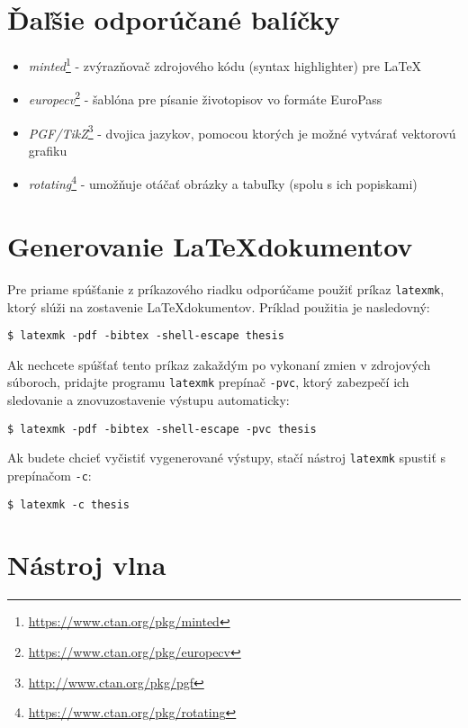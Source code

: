\section{Ďaľšie odporúčané balíčky}
\begin{itemize}
    \item \emph{minted}\footnote{\url{https://www.ctan.org/pkg/minted}} - zvýrazňovač zdrojového kódu (syntax highlighter) pre \LaTeX 
    \item \emph{europecv}\footnote{\url{https://www.ctan.org/pkg/europecv}} - šablóna pre písanie životopisov vo formáte EuroPass 
    \item \emph{PGF/TikZ}\footnote{\url{http://www.ctan.org/pkg/pgf}} - dvojica jazykov, pomocou ktorých je možné vytvárať vektorovú grafiku 
    \item \emph{rotating}\footnote{\url{https://www.ctan.org/pkg/rotating}} - umožňuje otáčať obrázky a tabuľky (spolu s ich popiskami)
\end{itemize}


\section{Generovanie \LaTeX dokumentov}

Pre priame spúšťanie z príkazového riadku odporúčame použiť príkaz {\tt latexmk}, ktorý slúži na zostavenie  \LaTeX dokumentov. Príklad použitia je nasledovný:

\begin{verbatim}
$ latexmk -pdf -bibtex -shell-escape thesis
\end{verbatim}

Ak nechcete spúšťať tento príkaz zakaždým po vykonaní zmien v zdrojových súboroch, pridajte programu {\tt latexmk} prepínač {\tt -pvc}, ktorý zabezpečí ich sledovanie a znovuzostavenie výstupu automaticky:

\begin{verbatim}
$ latexmk -pdf -bibtex -shell-escape -pvc thesis
\end{verbatim}

Ak budete chcieť vyčistiť vygenerované výstupy, stačí nástroj {\tt latexmk} spustiť s prepínačom {\tt -c}:

\begin{verbatim}
$ latexmk -c thesis
\end{verbatim}


\section{Nástroj vlna}

